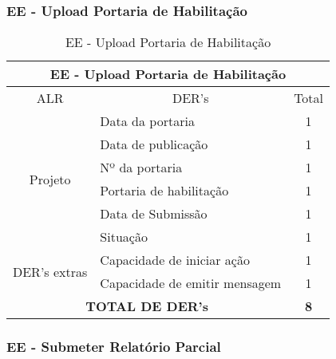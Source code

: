   \subsubsection{EE - Upload Portaria de Habilitação}
\begin{table}[!h]
\centering
\caption{EE - Upload Portaria de Habilitação}
\label{ee_upload_portaria_de_habilitacao}
\begin{tabular}{|c|l|c|}
\hline
\multicolumn{3}{|c|}{EE - Upload Portaria de Habilitação}                    \\ \hline
ALR                      & \multicolumn{1}{c|}{DER's} & Total \\ \hline
\multirow{6}{*}{Projeto} & Data da portaria                         & 1     \\ \cline{2-3} 
                         & Data de publicação            & 1     \\ \cline{2-3} 
                         & Nº da portaria      & 1     \\ \cline{2-3} 
                         & Portaria de habilitação              & 1     \\ \cline{2-3}
			 & Data de Submissão        & 1     \\ \cline{2-3} 
                         & Situação & 1     \\ \hline
\multirow{2}{*}{DER's extras}             & Capacidade de iniciar ação & 1      \\ \cline{2-3} 
			 & Capacidade de emitir mensagem & 1\\ \hline
\multicolumn{2}{|c|}{\textbf{TOTAL DE DER's}}                  & \textbf{8}     \\ \hline
\end{tabular}
\end{table}



\vfill
\pagebreak
  \subsubsection{EE - Submeter Relatório Parcial}

